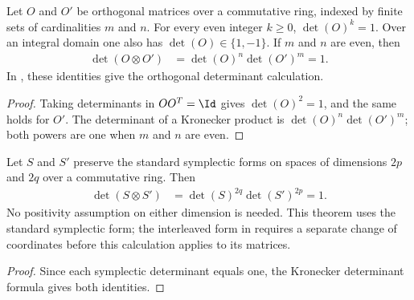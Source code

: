 \begin{lemma}
    \label{thm:mpu_orthogonal_kronecker_determinant}
    \leanok
    Let $O$ and $O'$ be orthogonal matrices over a commutative ring,
    indexed by finite sets of cardinalities $m$ and $n$. For every even
    integer $k\geq0$, $\det(O)^k=1$. Over an integral domain one also has
    $\det(O)\in\{1,-1\}$. If $m$ and $n$ are even, then
    \begin{align}
        \det(O\otimes O') & =\det(O)^n\det(O')^m=1.
    \end{align}
    In \cite{Cirac2017MPU}, these identities give the orthogonal determinant
    calculation.
\end{lemma}

\begin{proof}\leanok
    Taking determinants in $OO^T=\Id$ gives $\det(O)^2=1$, and the same holds
    for $O'$. The determinant of a Kronecker product is
    $\det(O)^n\det(O')^m$; both powers are one when $m$ and $n$ are even.
\end{proof}

\begin{lemma}
    \label{thm:mpu_symplectic_kronecker_determinant}
    \leanok
    Let $S$ and $S'$ preserve the standard symplectic forms on spaces of
    dimensions $2p$ and $2q$ over a commutative ring. Then
    \begin{align}
        \det(S\otimes S') & =\det(S)^{2q}\det(S')^{2p}=1.
    \end{align}
    No positivity assumption on either dimension is needed. This theorem
    uses the standard symplectic form; the interleaved form in
    \cite{Cirac2017MPU} requires a separate change of coordinates before
    this calculation applies to its matrices.
\end{lemma}

\begin{proof}\leanok
    Since each symplectic determinant equals one, the Kronecker determinant
    formula gives both identities.
\end{proof}


